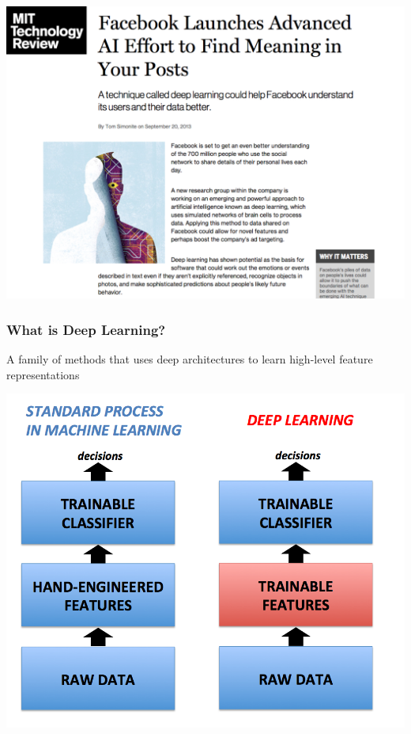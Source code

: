 \documentclass{beamer}
\begin{document}
\begin{frame}
\centerline{\includegraphics[scale=0.25]{figs/techreview_facebook}}
\end{frame}


\begin{frame}
\frametitle{What is Deep Learning?}
A family of methods that uses deep architectures to learn high-level feature representations
\pause
\centerline{\includegraphics[scale=0.27]{figs/deep_vs_conventional_learning}}
\end{frame}
\end{document}
